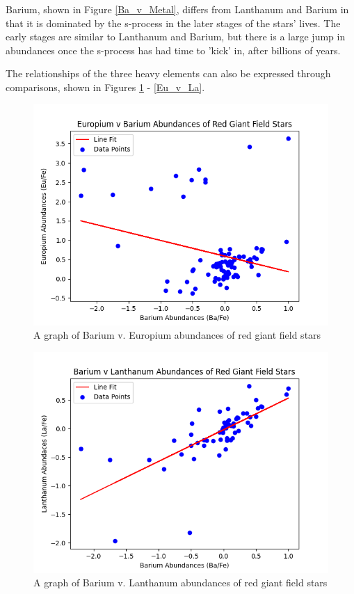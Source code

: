 Barium, shown in Figure \ref{Ba_v_Metal}, differs from Lanthanum and Barium in that it is dominated by the s-process in the later stages of the stars' lives. The early stages are similar to Lanthanum and Barium, but there is a large jump in abundances once the s-process has had time to 'kick' in, after billions of years.

The relationships of the three heavy elements can also be expressed through comparisons, shown in Figures \ref{Ba_v_Eu} - \ref{Eu_v_La}.

\begin{figure}[H]
  \includegraphics[width=\textwidth]{Ba_v_Eu.png}
  \caption{A graph of Barium v. Europium abundances of red giant field stars}
  \label{Ba_v_Eu}
\end{figure}

\begin{figure}[H]
  \includegraphics[width=\textwidth]{Ba_v_La.png}
  \caption{A graph of Barium v. Lanthanum abundances of red giant field stars}
  \label{Ba_v_La}
\end{figure}

